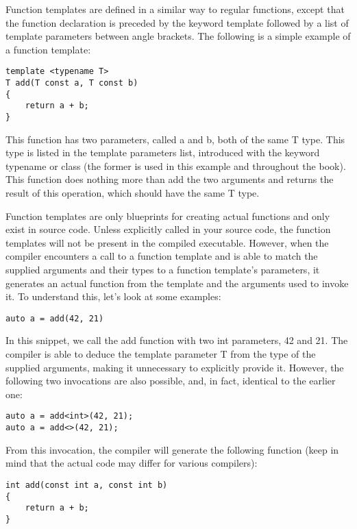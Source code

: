 Function templates are defined in a similar way to regular functions, except that the function declaration is preceded by the keyword template followed by a list of template parameters between angle brackets. The following is a simple example of a function template:

\begin{lstlisting}[style=styleCXX]
template <typename T>
T add(T const a, T const b)
{
	return a + b;
}
\end{lstlisting}

This function has two parameters, called a and b, both of the same T type. This type is listed in the template parameters list, introduced with the keyword typename or class (the former is used in this example and throughout the book). This function does nothing more than add the two arguments and returns the result of this operation, which should have the same T type.

Function templates are only blueprints for creating actual functions and only exist in source code. Unless explicitly called in your source code, the function templates will not be present in the compiled executable. However, when the compiler encounters a call to a function template and is able to match the supplied arguments and their types to a function template's parameters, it generates an actual function from the template and the arguments used to invoke it. To understand this, let's look at some examples:

\begin{lstlisting}[style=styleCXX]
auto a = add(42, 21)
\end{lstlisting}

In this snippet, we call the add function with two int parameters, 42 and 21. The compiler is able to deduce the template parameter T from the type of the supplied arguments, making it unnecessary to explicitly provide it. However, the following two invocations are also possible, and, in fact, identical to the earlier one:

\begin{lstlisting}[style=styleCXX]
auto a = add<int>(42, 21);
auto a = add<>(42, 21);
\end{lstlisting}

From this invocation, the compiler will generate the following function (keep in mind that the actual code may differ for various compilers):

\begin{lstlisting}[style=styleCXX]
int add(const int a, const int b)
{
	return a + b;
}
\end{lstlisting}

